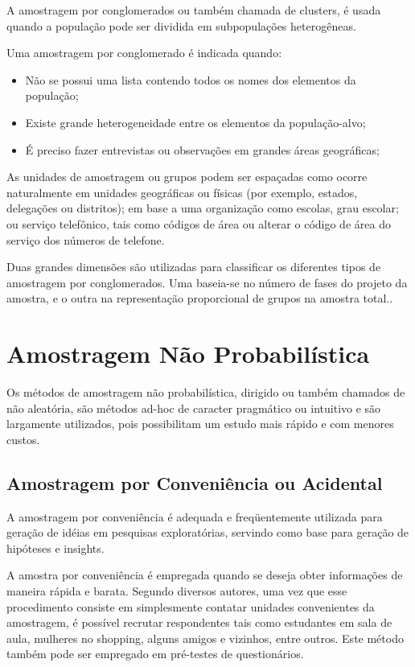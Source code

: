A amostragem por conglomerados ou também chamada de clusters, é usada quando a população
pode ser dividida em subpopulações heterogêneas.\vskip0.3cm

Uma amostragem por conglomerado é indicada quando:


\begin{itemize}
  \item Não se possui uma lista contendo todos os nomes dos elementos da população;
  \item Existe grande heterogeneidade entre os elementos da população-alvo;
  \item É preciso fazer entrevistas ou observações em grandes áreas geográficas;
\end{itemize}


As unidades de amostragem ou grupos podem ser espaçadas como ocorre naturalmente em unidades geográficas ou físicas (por exemplo, estados, delegações ou distritos); em base  a uma organização como escolas, grau escolar; ou serviço telefônico, tais como códigos de área ou alterar o código de área do serviço dos números de telefone.\vskip0.3cm

Duas grandes dimensões são utilizadas para classificar os diferentes tipos de amostragem por conglomerados. Uma baseia-se no número de fases do projeto da amostra, e o outra na representação proporcional de grupos na amostra total..\vskip0.3cm


\section{Amostragem Não Probabilística}


Os métodos de amostragem não probabilística, dirigido ou também chamados de não aleatória, são métodos ad-hoc de caracter pragmático ou intuitivo e são largamente utilizados, pois possibilitam um
estudo mais rápido e com menores custos.




\subsection{Amostragem por Conveniência ou Acidental}


\inic A amostragem por conveniência é adequada e freqüentemente utilizada para geração de idéias em pesquisas exploratórias, servindo como base para geração de hipóteses e insights.\vskip0.3cm



A amostra por conveniência é empregada quando se deseja obter informações de maneira rápida e barata. Segundo diversos autores, uma vez que esse procedimento consiste em simplesmente contatar unidades convenientes da amostragem, é possível recrutar respondentes tais como estudantes em sala de aula, mulheres no shopping, alguns amigos e vizinhos, entre outros. Este método também pode ser empregado em pré-testes de questionários.\vskip0.3cm


